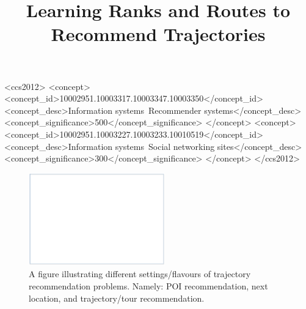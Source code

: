 \documentclass{sig-alternate-05-2015}
\begin{document}

\title{Learning Ranks and Routes to Recommend Trajectories}


\begin{CCSXML}
    <ccs2012>
    <concept>
    <concept_id>10002951.10003317.10003347.10003350</concept_id>
    <concept_desc>Information systems~Recommender systems</concept_desc>
    <concept_significance>500</concept_significance>
    </concept>
    <concept>
    <concept_id>10002951.10003227.10003233.10010519</concept_id>
    <concept_desc>Information systems~Social networking sites</concept_desc>
    <concept_significance>300</concept_significance>
    </concept>
    </ccs2012>
\end{CCSXML}

\maketitle

\begin{abstract}

\end{abstract}




\begin{figure}[tp]
	\centering
	\includegraphics[width=\textwidth,height=4cm]{fig/placeholder}
	\caption{A figure illustrating different settings/flavours of trajectory recommendation problems. Namely: POI recommendation, next location, and trajectory/tour recommendation.
}
	\label{fig:problems}
\end{figure}
\end{document}
